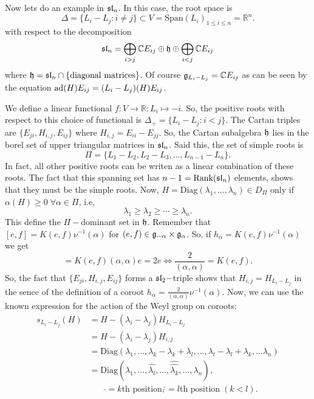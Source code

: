 Now lets do an example in $\mathfrak{sl}_n$. In this case, the root space is 
\begin{equation}
    \Delta =\{L_i-L_j: i\neq j\}\subset V=\text{Span}(L_i)_{1\leq i\leq n}=\mathbb{R}^n.
\end{equation}
with respect to the decomposition
\begin{equation}
    \mathfrak{sl}_n=\bigoplus_{i>j}\mathbb{C} E_{ij}\oplus\mathfrak{h}\oplus \bigoplus_{i<j}\mathbb{C} E_{ij}
\end{equation}
where $\mathfrak{h}=\mathfrak{sl}_n\cap\{\text{diagonal matrices}\}$. Of course $\mathfrak{g}_{L_i-L_j}=\mathbb{C} E_{ij}$ as can be seen by the
equation $\text{ad}(H)E_{ij}=(L_i-L_j)(H)E_{ij}$.\par
We define a linear functional $f: V\to\mathbb{R}: L_i\mapsto -i$. So, the positive roots with respect to this choice 
of functional is $\Delta_+=\{L_i-L_j:i<j\}$. The Cartan triples are $\{E_{ji},H_{i,j},E_{ij}\}$ where 
$H_{i,j}=E_{ii}-E_{jj}$. So, the Cartan subalgebra $\mathfrak{h}$ lies in the borel set of upper triangular matrices in 
$\mathfrak{sl}_n$. Said this, the set of simple roots is 
\begin{equation}
    \Pi =\{L_1-L_2,L_2-L_3,\dots, L_{n-1}-L_n\}.
\end{equation}
In fact, all other positive roots can be writen as a linear combination of these roots. The fact that this spanning set 
has $n-1=\text{Rank}(\mathfrak{sl}_n)$ elements, shows that they must be the simple roots. Now, 
$H=\text{Diag}(\lambda_1,\dots,\lambda_n)\in D_\Pi$ only if $\alpha(H)\geq0\;\forall\alpha\in\Pi$, i.e,
\begin{equation}
    \lambda_1\geq\lambda_2\geq\cdots\geq\lambda_n.
\end{equation}
This define the $\Pi-$dominant set in $\mathfrak{h}$. Remember that $[e,f]=K(e,f)\nu^{-1}(\alpha)$ for 
$(e,f)\in\mathfrak{g}_{-\alpha}\times\mathfrak{g}_\alpha$. So, if $h_\alpha=K(e,f)\nu^{-1}(\alpha)$ we get 
\begin{equation}
    [h_\alpha,e]=K(e,f)(\alpha,\alpha)e=2e\iff \frac{2}{(\alpha,\alpha)}=K(e,f).
\end{equation}
So, the fact that $\{E_{ji},H_{i,j},E_{ij}\}$ forms a $\mathfrak{sl}_2-$triple shows that $H_{i,j}=H_{L_i-L_j}$ in the sence 
of the definition of a coroot $h_\alpha=\frac{2}{(\alpha,\alpha)}\nu^{-1}(\alpha)$. Now, we can use the known expression
for the action of the Weyl group on coroots:
\begin{equation}
    \begin{split}
        s_{L_i-L_j}(H)&=H-(\lambda_i-\lambda_j)H_{L_i-L_j}\\
        &=H-(\lambda_i-\lambda_j)H_{i,j}\\
        &=\text{Diag}(\lambda_1,\dots,\lambda_k-\lambda_k+\lambda_l,\dots,\lambda_l-\lambda_l+\lambda_k,\dots\lambda_n)\\
        &=\text{Diag}(\lambda_1,\dots,\hat{\lambda_l},\dots,\hat{\hat{\lambda_k}},\dots,\lambda_n),\\ 
        &\quad\quad\hat{}=k\text{th position}, \hat{\hat{}}=l\text{th position} \;(k<l).
    \end{split}
\end{equation}
